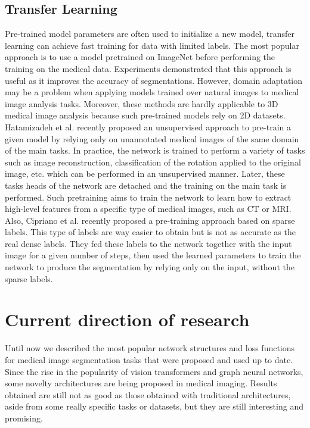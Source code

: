 \subsection{Transfer Learning}
Pre-trained model parameters are often used to initialize a new model,
transfer learning can achieve fast training for data with limited labels. The
most popular approach is to use a model pretrained on ImageNet before performing
the training on the medical data. Experiments demonstrated that this approach is
useful as it improves the accuracy of segmentations. However, domain
adaptation may be a problem when applying models trained over natural images to
medical image analysis tasks. Moreover, these methods are hardly applicable to
3D medical image analysis because such pre-trained models rely on 2D datasets.\\
Hatamizadeh et al. recently proposed an unsupervised approach to pre-train a
given model by relying only on unannotated medical images of the same domain of
the main tasks. In practice, the network is trained to perform a variety of tasks
such as image reconstruction, classification of the rotation applied to the
original image, etc. which can be performed in an unsupervised manner. Later,
these tasks heads of the network are detached and the training on the main task
is performed. Such pretraining aims to train the network to learn how to extract
high-level features from a specific type of medical images, such as CT or MRI.\\
Also, Cipriano et al. recently proposed a pre-training approach based on sparse labels.
This type of labels are way easier to obtain but is not as accurate as the real dense labels. They fed these labels to the network together with the input
image for a given number of steps, then used the learned parameters to train the
network to produce the segmentation by relying only on the input, without the
sparse labels.


\section{Current direction of research}
Until now we described the most popular network structures and loss functions
for medical image segmentation tasks that were proposed and used up to date.
Since the rise in the popularity of vision transformers and graph neural networks,
some novelty architectures are being proposed in medical imaging. Results
obtained are still not as good as those obtained with traditional architectures,
aside from some really specific tasks or datasets, but they are still interesting and
promising.\\

